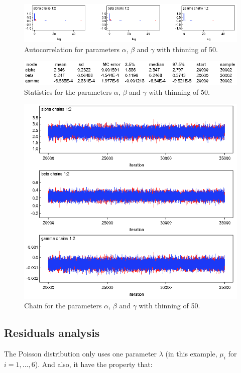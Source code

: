 \documentclass{article}
\begin{document}
  \begin{figure}[ht!]
  \centering
  \includegraphics[width=1\textwidth]{Figures/4.png}
  \caption{Autocorrelation for parameters $\alpha$, $\beta$ and $\gamma$ with thinning of 50.}
  \label{fig:fig3}
  \end{figure}
  \begin{figure}[ht!]
  \centering
  \includegraphics[width=.8\textwidth]{Figures/5.png}
  \caption{Statistics for the parameters $\alpha$, $\beta$ and $\gamma$ with thinning of 50.}
  \label{fig:fig5}
  \end{figure}
  \begin{figure}[ht!]
  \centering
  \includegraphics[width=.75\textwidth]{Figures/3.png}
  \caption{Chain for the parameters $\alpha$, $\beta$ and $\gamma$ with thinning of 50.}
  \label{fig:fig4}
  \end{figure}


\newpage  
\subsection{Residuals analysis}
The Poisson distribution only uses one parameter $\lambda$ (in this example, $\mu_i$ for $i = 1,...,6$). And also, it have the property that:
\end{document}
